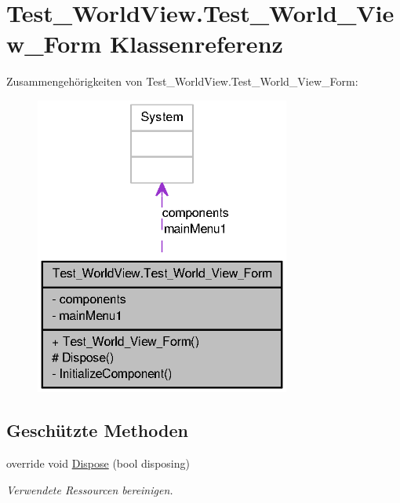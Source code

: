 \hypertarget{class_test___world_view_1_1_test___world___view___form}{
\section{Test\_\-WorldView.Test\_\-World\_\-View\_\-Form Klassenreferenz}
\label{class_test___world_view_1_1_test___world___view___form}
}


Zusammengehörigkeiten von Test\_\-WorldView.Test\_\-World\_\-View\_\-Form:\nopagebreak
\begin{figure}[H]
\begin{center}
\leavevmode
\includegraphics[width=238pt]{class_test___world_view_1_1_test___world___view___form__coll__graph}
\end{center}
\end{figure}
\subsection*{Geschützte Methoden}
\begin{DoxyCompactItemize}
\item 
override void \hyperlink{class_test___world_view_1_1_test___world___view___form_a58c32471c42109624080524e42837cf0}{Dispose} (bool disposing)
\begin{DoxyCompactList}\small\item\em Verwendete Ressourcen bereinigen. \item\end{DoxyCompactList}\end{DoxyCompactItemize}


